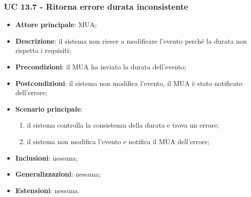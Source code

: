     \subsubsection{UC 13.7 - Ritorna errore durata inconsistente} \label{sec:UC13.7}
    \begin{itemize}
        \item \textbf{Attore principale}: MUA;
        \item \textbf{Descrizione}: il sistema non riesce a modificare l'evento perché la durata non rispetta i requisiti;
        \item \textbf{Precondizioni}: il MUA ha inviato la durata dell'evento;
        \item \textbf{Postcondizioni}: il sistema non modifica l'evento, il MUA è stato notificato dell'errore;
        \item \textbf{Scenario principale}:
            \begin{enumerate}
                \item il sistema controlla la consistenza della durata e trova un errore;
                \item il sistema non modifica l'evento e notifica il MUA dell'errore;
            \end{enumerate}
        \item \textbf{Inclusioni}: nessuna;
        \item \textbf{Generalizzazioni}: nessuna;
        \item \textbf{Estensioni}: nessuna.
    \end{itemize}